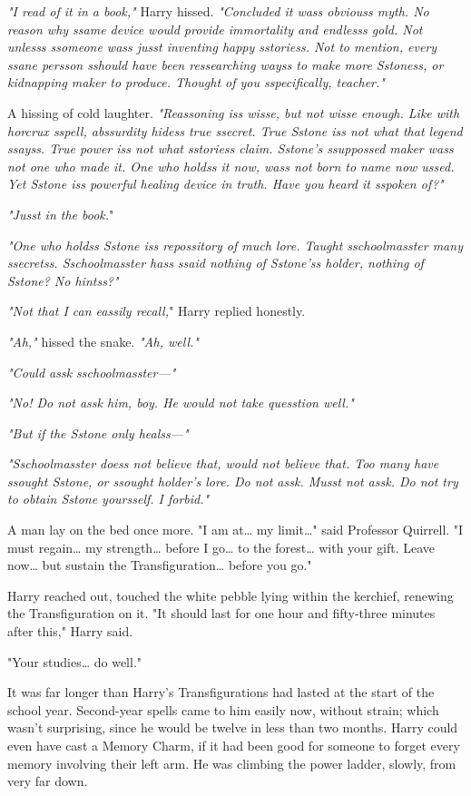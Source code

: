 \emph{"I read of it in a book,"} Harry hissed. \emph{"Concluded it wass obviouss myth. No reason why ssame device would provide immortality and endlesss gold. Not unlesss ssomeone wass jusst inventing happy sstoriess. Not to mention, every ssane persson sshould have been ressearching wayss to make more Sstoness, or kidnapping maker to produce. Thought of you sspecifically, teacher."}

A hissing of cold laughter. \emph{"Reassoning iss wisse, but not wisse enough. Like with horcrux sspell, abssurdity hidess true ssecret. True Sstone iss not what that legend ssayss. True power iss not what sstoriess claim. Sstone's ssuppossed maker wass not one who made it. One who holdss it now, wass not born to name now ussed. Yet Sstone iss powerful healing device in truth. Have you heard it sspoken of?"}

\emph{"Jusst in the book.}"

\emph{"One who holdss Sstone iss repossitory of much lore. Taught sschoolmasster many ssecretss. Sschoolmasster hass ssaid nothing of Sstone'ss holder, nothing of Sstone? No hintss?"}

\emph{"Not that I can eassily recall,}" Harry replied honestly.

\emph{"Ah,"} hissed the snake. \emph{"Ah, well."}

\emph{"Could assk sschoolmasster---"}

\emph{"No! Do not assk him, boy. He would not take quesstion well."}

\emph{"But if the Sstone only healss---"}

\emph{"Sschoolmasster doess not believe that, would not believe that. Too many have ssought Sstone, or ssought holder's lore. Do not assk. Musst not assk. Do not try to obtain Sstone yoursself. I forbid."}

A man lay on the bed once more. "I am at{\ldots} my limit{\ldots}" said Professor Quirrell. "I must regain{\ldots} my strength{\ldots} before I go{\ldots} to the forest{\ldots} with your gift. Leave now{\ldots} but sustain the Transfiguration{\ldots} before you go."

Harry reached out, touched the white pebble lying within the kerchief, renewing the Transfiguration on it. "It should last for one hour and fifty-three minutes after this," Harry said.

"Your studies{\ldots} do well."

It was far longer than Harry's Transfigurations had lasted at the start of the school year. Second-year spells came to him easily now, without strain; which wasn't surprising, since he would be twelve in less than two months. Harry could even have cast a Memory Charm, if it had been good for someone to forget every memory involving their left arm. He was climbing the power ladder, slowly, from very far down.

